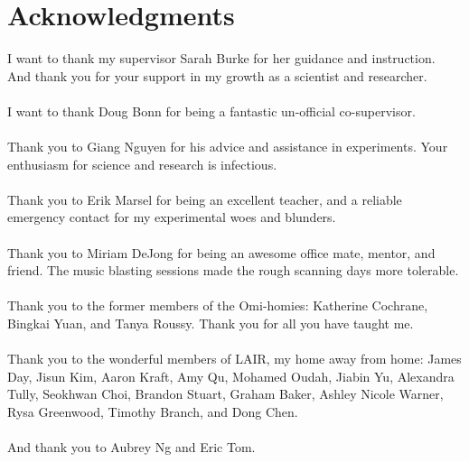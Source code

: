 
\chapter{Acknowledgments}

I want to thank my supervisor Sarah Burke for her guidance and instruction. And thank you for your support in my growth as a scientist and researcher.\\
\\
I want to thank Doug Bonn for being a fantastic un-official co-supervisor.\\
\\
Thank you to Giang Nguyen for his advice and assistance in experiments. Your enthusiasm for science and research is infectious. \\
\\
Thank you to Erik Marsel for being an excellent teacher, and a reliable emergency contact for my experimental woes and blunders.\\
\\
Thank you to Miriam DeJong for being an awesome office mate, mentor, and friend. The music blasting sessions made the rough scanning days more tolerable.\\
\\
Thank you to the former members of the Omi-homies: Katherine Cochrane, Bingkai Yuan, and Tanya Roussy. Thank you for all you have taught me.\\
\\
Thank you to the wonderful members of LAIR, my home away from home: James Day, Jisun Kim, Aaron Kraft, Amy Qu, Mohamed Oudah, Jiabin Yu, Alexandra Tully, Seokhwan Choi, Brandon Stuart, Graham Baker, Ashley Nicole Warner, Rysa Greenwood, Timothy Branch, and Dong Chen.\\
\\
And thank you to Aubrey Ng and Eric Tom.








